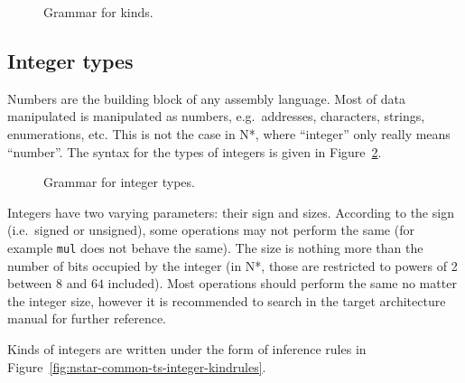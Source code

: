 \begin{figure}[htb]
  \centering
  \caption{Grammar for kinds.}
  \label{fig:nstar-common-ts-kinds-syntax}
\end{figure}

\subsection{Integer types}\label{subsec:nstar-common-ts-integer}

Numbers are the building block of any assembly language. Most of data manipulated is manipulated as numbers, e.g.\ addresses, characters, strings, enumerations, etc.
This is not the case in N*, where ``integer''  only really means ``number''.
The syntax for the types of integers is given in Figure~\ref{fig:nstar-common-ts-integer-syntax}.

\begin{figure}[htb]
  \centering
  \caption{Grammar for integer types.}
  \label{fig:nstar-common-ts-integer-syntax}
\end{figure}

Integers have two varying parameters: their sign and sizes.
According to the sign (i.e.\ signed or unsigned), some operations may not perform the same (for example \texttt{mul} does not behave the same).
The size is nothing more than the number of bits occupied by the integer (in N*, those are restricted to powers of 2 between $8$ and $64$ included).
Most operations should perform the same no matter the integer size, however it is recommended to search in the target architecture manual for further reference.

Kinds of integers are written under the form of inference rules in Figure~\ref{fig:nstar-common-ts-integer-kindrules}.

